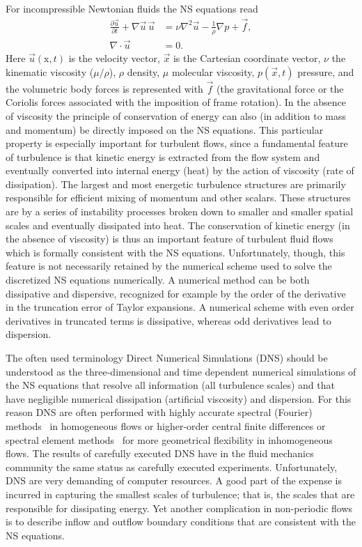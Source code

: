 For incompressible Newtonian fluids the NS equations read
\begin{align}
 \frac{\partial \vec{u}}{\partial t}+\nabla \vec{u} \,  \vec{u}  &= \nu \nabla^2 \vec{u} -\frac{1}{\rho} \nabla p +\vec{f}, \label{eq:mortensen:NS}\\
 \nabla \cdot \vec{u} &=0.
 \label{eq:mortensen:cont}
\end{align}
Here $\vec{u}(\text{x},t)$ is the velocity vector, $\vec{x}$
is the Cartesian coordinate vector, $\nu$ the kinematic viscosity
($\mu/\rho$), $\rho$ density, $\mu$ molecular viscosity, $p(\vec{x},t)$
pressure, and the volumetric body forces is represented with $\vec{f}$
(the gravitational force or the Coriolis forces associated with the
imposition of frame rotation). In the absence of viscosity the principle
of conservation of energy can also (in addition to mass and momentum)
be directly imposed on the NS equations. This particular property is
especially important for turbulent flows, since a fundamental feature
of turbulence is that kinetic energy is extracted from the flow system
and eventually converted into internal energy (heat) by the action of
viscosity (rate of dissipation). The largest and most energetic turbulence
structures are primarily responsible for efficient mixing of momentum
and other scalars. These structures are by a series of instability
processes broken down to smaller and smaller spatial scales and eventually
dissipated into heat. The conservation of kinetic energy (in the absence
of viscosity) is thus an important feature of turbulent fluid flows which
is formally consistent with the NS equations. Unfortunately, though,
this feature is not necessarily retained by the numerical scheme used to
solve the discretized NS equations numerically. A numerical method can be
both dissipative and dispersive, recognized for example by the order of
the derivative in the truncation error of Taylor expansions. A numerical
scheme with even order derivatives in truncated terms is dissipative,
whereas odd derivatives lead to dispersion.

The often used terminology Direct Numerical Simulations (DNS) should
be understood as the three-dimensional and time dependent numerical
simulations of the NS equations that resolve all information
(all turbulence scales) and that have negligible numerical
dissipation (artificial viscosity) and dispersion. For this reason
DNS are often performed with highly accurate spectral (Fourier)
methods~\citep{CanutoHussainiQuarteroniEtAl1988} in homogeneous
flows or higher-order central finite differences or spectral element
methods~\citep{Blackburn2009} for more geometrical flexibility in
inhomogeneous flows. The results of carefully executed DNS have in
the fluid mechanics community the same status as carefully executed
experiments. Unfortunately, DNS are very demanding of computer
resources. A good part of the expense is incurred in capturing the
smallest scales of turbulence; that is, the scales that are responsible
for dissipating energy. Yet another complication in non-periodic flows
is to describe inflow and outflow boundary conditions that are consistent
with the NS equations.


